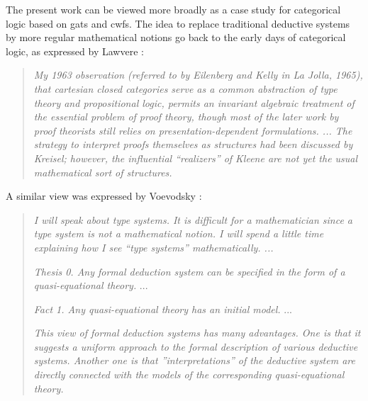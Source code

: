 \documentclass[11pt,a4paper]{article}
\theoremstyle{plain}
\theoremstyle{definition}
\begin{document}
The present work can be viewed more broadly as a case study for categorical logic based on gats and cwfs. The idea to replace traditional deductive systems by more regular mathematical notions go back to the early days of categorical logic, as expressed by Lawvere \cite{lawvere:tac-adjointness}:
\begin{quotation}
\emph{
My 1963 observation (referred to by Eilenberg and Kelly in La Jolla, 1965), that cartesian closed categories serve as a common abstraction of type theory and propositional
logic, permits an invariant algebraic treatment of the essential problem of proof theory,
though most of the later work by proof theorists still relies on presentation-dependent
formulations. ... The strategy to interpret proofs themselves as structures had
been discussed by Kreisel; however, the influential “realizers” of Kleene are not yet the
usual mathematical sort of structures.
}
\end{quotation}
A similar view was expressed by Voevodsky \cite{voevodsky:cmu2010}:
\begin{quotation}
\emph{
I will speak about type systems. It is diﬃcult for a mathematician since
a type system is not a mathematical notion. I will spend a little time
explaining how I see ``type systems” mathematically. ...}

\emph{Thesis 0. Any formal deduction system can be specified in the form of a
quasi-equational theory.} ...

\emph{Fact 1. Any quasi-equational theory has an initial model.} ...

\emph{This view of formal deduction systems has many advantages. One is that it
suggests a uniform approach to the formal description of various deductive
systems. Another one is that ”interpretations” of the deductive system are
directly connected with the models of the corresponding quasi-equational
theory.}
\end{quotation}
\end{document}

